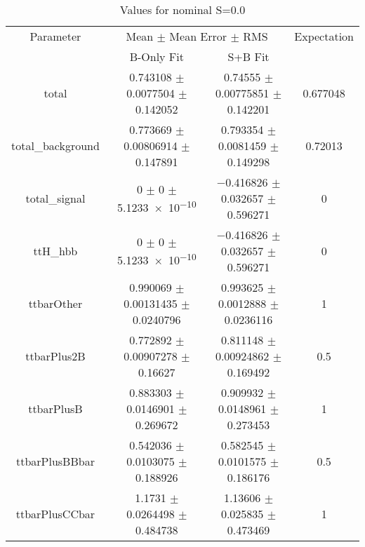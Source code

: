 \begin{table}
\centering
\caption{Values for nominal S=0.0}
\begin{tabular}{cccc}
\toprule
Parameter & \multicolumn{2}{c}{Mean $\pm$ Mean Error $\pm$ RMS} & Expectation\\
 & B-Only Fit & S+B Fit & \\
\midrule
total & \num{0.743108} $\pm$ \num{0.0077504} $\pm$ \num{0.142052} & \num{0.74555} $\pm$ \num{0.00775851} $\pm$ \num{0.142201} & \num{0.677048}\\
total\_background & \num{0.773669} $\pm$ \num{0.00806914} $\pm$ \num{0.147891} & \num{0.793354} $\pm$ \num{0.0081459} $\pm$ \num{0.149298} & \num{0.72013}\\
total\_signal & \num{0} $\pm$ \num{0} $\pm$ \num{5.1233e-10} & \num{-0.416826} $\pm$ \num{0.032657} $\pm$ \num{0.596271} & \num{0}\\
ttH\_hbb & \num{0} $\pm$ \num{0} $\pm$ \num{5.1233e-10} & \num{-0.416826} $\pm$ \num{0.032657} $\pm$ \num{0.596271} & \num{0}\\
ttbarOther & \num{0.990069} $\pm$ \num{0.00131435} $\pm$ \num{0.0240796} & \num{0.993625} $\pm$ \num{0.0012888} $\pm$ \num{0.0236116} & \num{1}\\
ttbarPlus2B & \num{0.772892} $\pm$ \num{0.00907278} $\pm$ \num{0.16627} & \num{0.811148} $\pm$ \num{0.00924862} $\pm$ \num{0.169492} & \num{0.5}\\
ttbarPlusB & \num{0.883303} $\pm$ \num{0.0146901} $\pm$ \num{0.269672} & \num{0.909932} $\pm$ \num{0.0148961} $\pm$ \num{0.273453} & \num{1}\\
ttbarPlusBBbar & \num{0.542036} $\pm$ \num{0.0103075} $\pm$ \num{0.188926} & \num{0.582545} $\pm$ \num{0.0101575} $\pm$ \num{0.186176} & \num{0.5}\\
ttbarPlusCCbar & \num{1.1731} $\pm$ \num{0.0264498} $\pm$ \num{0.484738} & \num{1.13606} $\pm$ \num{0.025835} $\pm$ \num{0.473469} & \num{1}\\
\bottomrule
\end{tabular}
\end{table}